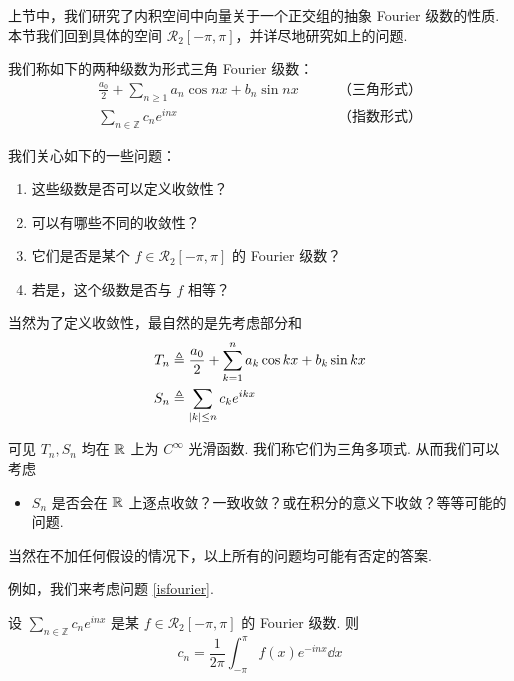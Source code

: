 上节中，我们研究了内积空间中向量关于一个正交组的抽象 Fourier 级数的性质. 本节我们回到具体的空间 $\mathcal{R}_2[-\pi,\pi]$，并详尽地研究如上的问题.



我们称如下的两种级数为形式三角 Fourier 级数：
$$
\begin{matrix}
    \displaystyle\frac{a_0}{2}+\sum_{n\ge 1}a_n\cos nx+b_n\sin nx & \qquad\text{（三角形式）}\\
    \displaystyle\sum_{n\in\mathbb{Z}}c_ne^{inx} & \qquad\text{（指数形式）}
\end{matrix}
$$

我们关心如下的一些问题：

\begin{enumerate}
    \item 这些级数是否可以定义收敛性？
    
    \item 可以有哪些不同的收敛性？
    
    \item\label{isfourier} 它们是否是某个 $f\in \mathcal{R}_2[-\pi,\pi]$ 的 Fourier 级数？
    
    \item 若是，这个级数是否与 $f$ 相等？
\end{enumerate}

当然为了定义收敛性，最自然的是先考虑部分和
$$
\begin{aligned}
    T_n&\triangleq\frac{a_0}{2}+\sum_{k=1}^na_k\cos kx+b_k\sin kx\\
    S_n&\triangleq\sum_{\left\lvert{k}\right\rvert\le n}c_ke^{ikx}
\end{aligned}
$$

可见 $T_n,S_n$ 均在 $\mathbb{R}$ 上为 $C^\infty$ 光滑函数. 我们称它们为三角多项式. 从而我们可以考虑

\begin{itemize}
    \item $S_n$ 是否会在 $\mathbb{R}$ 上逐点收敛？一致收敛？或在积分的意义下收敛？等等可能的问题.
\end{itemize}

当然在不加任何假设的情况下，以上所有的问题均可能有否定的答案.

例如，我们来考虑问题 \ref{isfourier}.

设 $\displaystyle\sum_{n\in\mathbb{Z}}c_ne^{inx}$ 是某 $f\in \mathcal{R}_2[-\pi,\pi]$ 的 Fourier 级数. 则
$$
c_n=\frac{1}{2\pi}\int_{-\pi}^{\pi}f(x)e^{-inx}\dd x
$$

